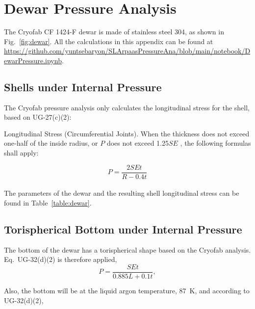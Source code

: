 \section{Dewar Pressure Analysis}
\label{app:dewar_pressure_ana}

The Cryofab CF 1424-F dewar is made of stainless steel 304,
as shown in Fig.~\ref{fig:dewar}.
All the calculations in this appendix can be found at
\url{https://github.com/yuntsebaryon/SLArpaasPressureAna/blob/main/notebook/DewarPressure.ipynb}.

\subsection{Shells under Internal Pressure}
\label{app:shell}

The Cryofab pressure analysis only calculates the longitudinal 
stress for the shell, based on UG-27(c)(2):

\begin{displayquote}
    Longitudinal Stress (Circumferential Joints). When the thickness does not exceed 
    one‐half of the inside radius, or $P$ does not exceed 1.25$SE$ , 
    the following formulas shall apply:\\
\end{displayquote}

\begin{equation}
    P = \frac{2SEt}{R-0.4t}
\end{equation}
\\

The parameters of the dewar and the resulting shell longitudinal stress
can be found in Table~\ref{table:dewar}.



\subsection{Torispherical Bottom under Internal Pressure}
\label{app:bottom}

The bottom of the dewar has a torispherical shape based on the Cryofab
analysis.
Eq.~UG-32(d)(2) is therefore applied,
\begin{equation}
    P = \frac{SEt}{0.885L+0.1t},
\label{eq:UG-32_d_2}
\end{equation}

Also, the bottom will be at the liquid argon temperature, 87~K,
and according to UG-32(d)(2),

